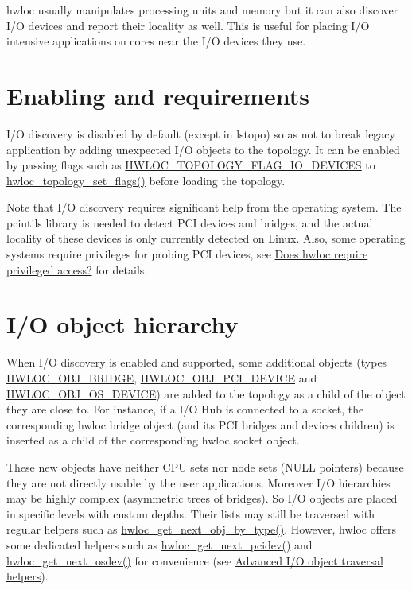 hwloc usually manipulates processing units and memory but it can also discover I/O devices and report their locality as well. This is useful for placing I/O intensive applications on cores near the I/O devices they use.\hypertarget{a00005_iodevices_enabling}{}\section{Enabling and requirements}\label{a00005_iodevices_enabling}
I/O discovery is disabled by default (except in lstopo) so as not to break legacy application by adding unexpected I/O objects to the topology. It can be enabled by passing flags such as {\ttfamily \hyperlink{a00044_ggada025d3ec20b4b420f8038d23d6e7bdea46ae25e8896278840b1800ae9ce4de41}{HWLOC\_\-TOPOLOGY\_\-FLAG\_\-IO\_\-DEVICES}} to \hyperlink{a00044_ga6d11e53db143ac39c32cdb3912b71f99}{hwloc\_\-topology\_\-set\_\-flags()} before loading the topology.

Note that I/O discovery requires significant help from the operating system. The pciutils library is needed to detect PCI devices and bridges, and the actual locality of these devices is only currently detected on Linux. Also, some operating systems require privileges for probing PCI devices, see \hyperlink{a00011_faq_privileged}{Does hwloc require privileged access?} for details.\hypertarget{a00005_iodevices_hierarchy}{}\section{I/O object hierarchy}\label{a00005_iodevices_hierarchy}
When I/O discovery is enabled and supported, some additional objects (types {\ttfamily \hyperlink{a00041_ggacd37bb612667dc437d66bfb175a8dc55a6825f10895fea60aca7a6ba9fe273db0}{HWLOC\_\-OBJ\_\-BRIDGE}}, {\ttfamily \hyperlink{a00041_ggacd37bb612667dc437d66bfb175a8dc55a5d8117a54df1fbd3606ab19e42cb0ea9}{HWLOC\_\-OBJ\_\-PCI\_\-DEVICE}} and {\ttfamily \hyperlink{a00041_ggacd37bb612667dc437d66bfb175a8dc55a51e7280240fd9f25589cbbe538bdb075}{HWLOC\_\-OBJ\_\-OS\_\-DEVICE}}) are added to the topology as a child of the object they are close to. For instance, if a I/O Hub is connected to a socket, the corresponding hwloc bridge object (and its PCI bridges and devices children) is inserted as a child of the corresponding hwloc socket object.

These new objects have neither CPU sets nor node sets (NULL pointers) because they are not directly usable by the user applications. Moreover I/O hierarchies may be highly complex (asymmetric trees of bridges). So I/O objects are placed in specific levels with custom depths. Their lists may still be traversed with regular helpers such as \hyperlink{a00053_ga5f08ceb69375341e73563cfe2e77534e}{hwloc\_\-get\_\-next\_\-obj\_\-by\_\-type()}. However, hwloc offers some dedicated helpers such as \hyperlink{a00064_gad6e1ed122ef3b6e098538d75acd5e3f6}{hwloc\_\-get\_\-next\_\-pcidev()} and \hyperlink{a00064_ga73a5bc6265642e6001f7a10812ab886d}{hwloc\_\-get\_\-next\_\-osdev()} for convenience (see \hyperlink{a00064}{Advanced I/O object traversal helpers}).

